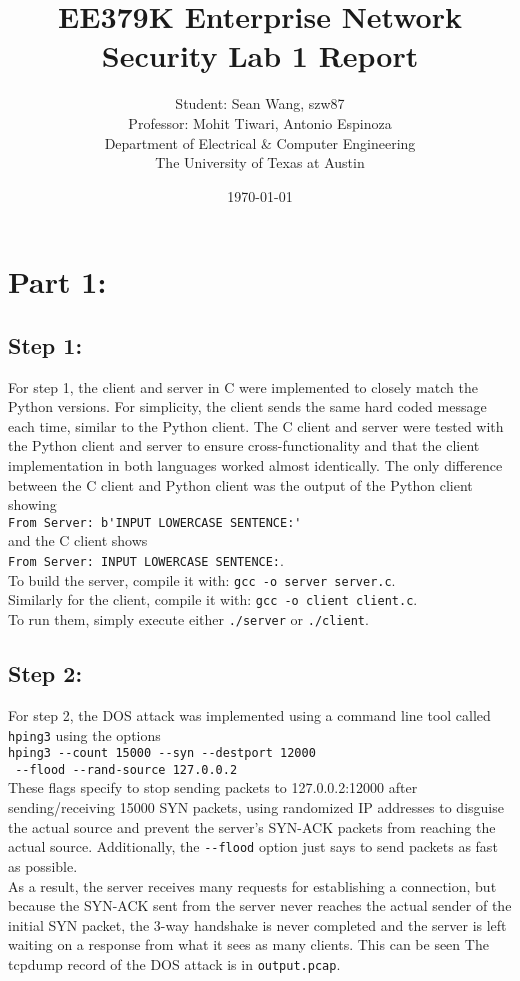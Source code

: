 \documentclass[11pt]{article}
\author{Student: Sean Wang, szw87 \\ Professor: Mohit Tiwari, Antonio Espinoza \\ Department of Electrical \& Computer Engineering \\ The University of Texas at Austin}
\date{\today}
\title{EE379K Enterprise Network Security Lab 1 Report}
\begin{document}
\maketitle
\section*{Part 1:}
\subsection*{Step 1:}
For step 1, the client and server in C were implemented to closely match the Python versions.
For simplicity, the client sends the same hard coded message each time, similar to the Python
client. The C client and server were tested with the Python client and server to ensure
cross-functionality and that the client implementation in both languages worked almost
identically. The only difference between the C client and Python client was the output of the
Python client showing \\
\indent\indent \verb|From Server: b'INPUT LOWERCASE SENTENCE:'|\\
and the C client shows\\
\indent\indent \verb|From Server: INPUT LOWERCASE SENTENCE:|.\\
To build the server, compile it with: \verb|gcc -o server server.c|.\\
Similarly for the client, compile it with: \verb|gcc -o client client.c|.\\
To run them, simply execute either \verb|./server| or \verb|./client|.
\subsection*{Step 2:}
For step 2, the DOS attack was implemented using a command line tool called \verb|hping3| using
the options\\
\indent\indent\verb|hping3 --count 15000 --syn --destport 12000|\\
\indent\indent\indent\indent \verb| --flood --rand-source 127.0.0.2|\\
These flags specify to stop sending packets to 127.0.0.2:12000 after sending/receiving 15000
SYN packets, using randomized IP addresses to disguise the actual source and prevent the
server's SYN-ACK packets from reaching the actual source. Additionally, the \verb|--flood|
option just says to send packets as fast as possible.\\
As a result, the server receives many requests for establishing a connection, but because the
SYN-ACK sent from the server never reaches the actual sender of the initial SYN packet, the
3-way handshake is never completed and the server is left waiting on a response from what it
sees as many clients. This can be seen  The tcpdump record of the DOS attack is in \verb|output.pcap|.
\end{document}
